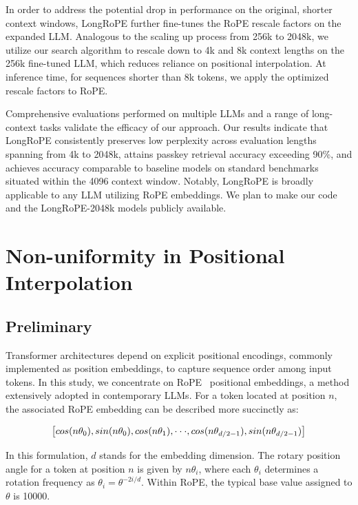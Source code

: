 In order to address the potential drop in performance on the original, shorter context windows, {LongRoPE} further fine-tunes the RoPE rescale factors on the expanded LLM. Analogous to the scaling up process from 256k to 2048k, we utilize our search algorithm to rescale down to 4k and 8k context lengths on the 256k fine-tuned LLM, which reduces reliance on positional interpolation. At inference time, for sequences shorter than 8k tokens, we apply the optimized rescale factors to RoPE.

Comprehensive evaluations performed on multiple LLMs and a range of long-context tasks validate the efficacy of our approach. Our results indicate that LongRoPE consistently preserves low perplexity across evaluation lengths spanning from 4k to 2048k, attains passkey retrieval accuracy exceeding 90\%, and achieves accuracy comparable to baseline models on standard benchmarks situated within the 4096 context window. Notably, LongRoPE is broadly applicable to any LLM utilizing RoPE embeddings. We plan to make our code and the LongRoPE-2048k models publicly available.

\section{Non-uniformity in Positional Interpolation}
\label{sec:analysis}

\subsection{Preliminary}

Transformer architectures depend on explicit positional encodings, commonly implemented as position embeddings, to capture sequence order among input tokens. In this study, we concentrate on RoPE~\cite{rope} positional embeddings, a method extensively adopted in contemporary LLMs. For a token located at position $n$, the associated RoPE embedding can be described more succinctly as:

\begin{equation}
		\fontsize{7.8}{7.8} \selectfont
	\label{eq:rope}
	\left[ cos(n\theta_0), sin(n\theta_0), cos(n\theta_1), \cdot\cdot\cdot, cos(n\theta_{d/2-1}), sin(n\theta_{d/2-1}) \right]   
\end{equation}

In this formulation, $d$ stands for the embedding dimension. The rotary position angle for a token at position $n$ is given by $n\theta_i$, where each $\theta_i$ determines a rotation frequency as $\theta_i = \theta^{-2i/d}$. Within RoPE, the typical base value assigned to $\theta$ is 10000.

